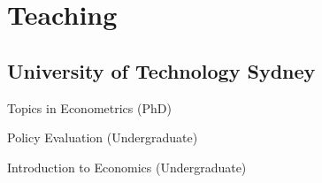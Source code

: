 \documentclass[10pt,letterpaper]{article}
\renewenvironment{itemize}{
  \begin{list}{}{
      \setlength{\leftmargin}{1.5em}
      \setlength{\itemsep}{0.25em}
      \setlength{\parskip}{0pt}
      \setlength{\parsep}{0.25em}
    }
}{
  \end{list}
}
\begin{document}
\section*{Teaching}

%

\subsection*{University of Technology Sydney}

\begin{itemize}
\item Topics in Econometrics (PhD)
\item Policy Evaluation (Undergraduate)
\item Introduction to Economics (Undergraduate)
\end{itemize}


\end{document}

